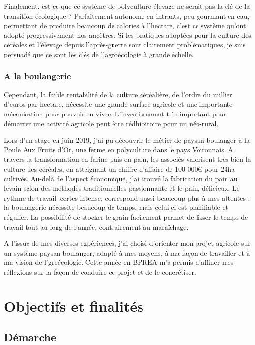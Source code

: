 \documentclass{book}
\begin{document}
Finalement, est-ce que ce système de polyculture-élevage ne serait pas la clé de la transition écologique ? Parfaitement autonome en intrants, peu gourmant en eau, permettant de produire beaucoup de calories à l'hectare, c'est ce système qu'ont adopté progressivement nos ancètres. Si les pratiques adoptées pour la culture des céréales et l'élevage depuis l'après-guerre sont clairement problématiques, je suis persuadé que ce sont les clés de l'agroécologie à grande échelle. 

\subsubsection{A la boulangerie}

Cependant, la faible rentabilité de la culture céréalière, de l'ordre du millier d'euros par hectare, nécessite une grande surface agricole et une importante mécanisation pour pouvoir en vivre. L'investissement très important pour démarrer une activité agricole peut être rédhibitoire pour un néo-rural. 

Lors d'un stage en juin 2019, j'ai pu découvrir le métier de paysan-boulanger à la Poule Aux Fruits d'Or, une ferme en polyculture dans le pays Voironnais. A travers la transformation en farine puis en pain, les associés valorisent très bien la culture des céréales, en atteignant un chiffre d'affaire de 100 000\euro{} pour 24ha cultivés. Au-delà de l'aspect économique, j'ai trouvé la fabrication du pain au levain selon des méthodes traditionnelles passionnante et le pain, délicieux. Le rythme de travail, certes intense, correspond aussi beaucoup plus à mes attentes : la boulangerie nécessite beaucoup de temps, mais celui-ci est planifiable et régulier. La possibilité de stocker le grain facilement permet de lisser le temps de travail tout au long de l'année, contrairement au maraîchage. 

A l'issue de mes diverses expériences, j'ai choisi d'orienter mon projet agricole sur un système paysan-boulanger, adapté à mes moyens, à ma façon de travailler et à ma vision de l'groécologie. Cette année en BPREA m'a permis d'affiner mes réflexions sur la façon de conduire ce projet et de le concrétiser. 

\section{Objectifs et finalités}

\subsection{Démarche}
\end{document}
